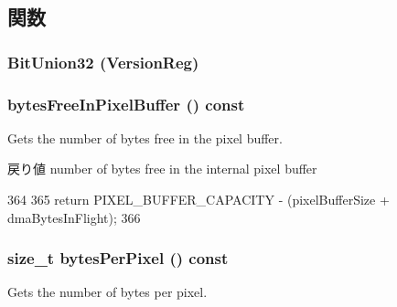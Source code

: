 \subsection{関数}
\hypertarget{classHDLcd_aec6571bbae7a34d8f4acc94770b38fad}{
\subsubsection[{BitUnion32}]{\setlength{\rightskip}{0pt plus 5cm}BitUnion32 (VersionReg)}}
\label{classHDLcd_aec6571bbae7a34d8f4acc94770b38fad}
\hypertarget{classHDLcd_a83badcd3087541a2fd96f093739247cb}{
\subsubsection[{bytesFreeInPixelBuffer}]{ bytesFreeInPixelBuffer () const}}
\label{classHDLcd_a83badcd3087541a2fd96f093739247cb}
Gets the number of bytes free in the pixel buffer.

\begin{DoxyReturn}{戻り値}
number of bytes free in the internal pixel buffer 
\end{DoxyReturn}



\begin{DoxyCode}
364                                                    {
365         return PIXEL_BUFFER_CAPACITY - (pixelBufferSize + dmaBytesInFlight);
366     }
\end{DoxyCode}
\hypertarget{classHDLcd_aceeb8e7b68e5186d2459b6ec91a71169}{
\subsubsection[{bytesPerPixel}]{\setlength{\rightskip}{0pt plus 5cm}size\_\-t bytesPerPixel () const}}
\label{classHDLcd_aceeb8e7b68e5186d2459b6ec91a71169}
Gets the number of bytes per pixel.

